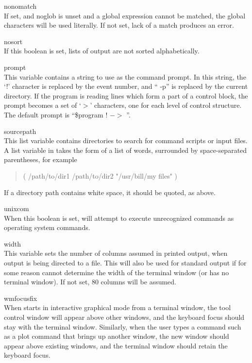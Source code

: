 \begin{description}
\item{\et nonomatch}\\
If set, and {\et noglob} is unset and a global expression cannot be
matched, the global characters will be used literally.  If not set,
lack of a match produces an error.

\item{\et nosort}\\
If this boolean is set, lists of output are not sorted alphabetically.

\item{\et prompt}\\
This variable contains a string to use as the command prompt.  In this
string, the `!' character is replaced by the event number, and ``{\vt
-p}'' is replaced by the current directory.  If the program is reading
lines which form a part of a control block, the prompt becomes a set
of `$>$' characters, one for each level of control structure.  The
default prompt is ``{\vt \$program !  $->$ }''.

\item{\et sourcepath}\\
This list variable contains directories to search for command scripts
or input files.  A list variable in {\WRspice} takes the form of a
list of words, surrounded by space-separated parentheses, for example
\begin{quote}\vt
( /path/to/dir1 /path/to/dir2 "/usr/bill/my files" )
\end{quote}
If a directory path contains white space, it should be quoted, as
above.

\item{\et unixcom}\\
When this boolean is set, {\WRspice} will attempt to execute unrecognized
commands as operating system commands.

\item{\et width}\\
This variable sets the number of columns assumed in printed output,
when output is being directed to a file.  This will also be used for
standard output if for some reason {\WRspice} cannot determine the
width of the terminal window (or has no terminal window).  If not set,
80 columns will be assumed.

\item{\et wmfocusfix}\\
When {\WRspice} starts in interactive graphical mode from a terminal
window, the tool control window will appear above other windows, and
the keyboard focus should stay with the terminal window.  Similarly,
when the user types a command such as a plot command that brings up
another window, the new window should appear above existing windows,
and the terminal window should retain the keyboard focus.


\end{description}
